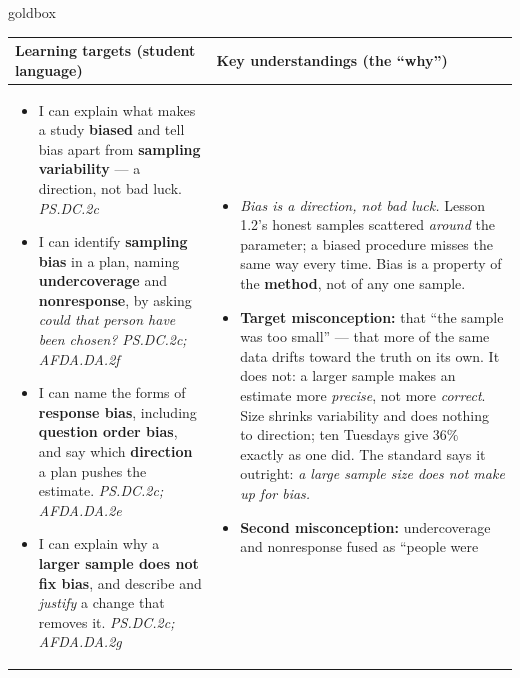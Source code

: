 \documentclass[10pt]{article}
\begin{document}
\renewcommand{\arraystretch}{1.4}
\boxguard
\begin{skillbox}{goldbox}
\begin{tabularx}{\linewidth}{@{}X|X@{}}
\textbf{Learning targets (student language)} & \textbf{Key understandings (the ``why'')} \\[2pt]
\hline
\vspace{-6pt}
\begin{itemize}[leftmargin=1.1em, nosep, after=\vspace{2pt}]
  \item I can explain what makes a study \textbf{biased} and tell bias apart from
        \textbf{sampling variability} --- a direction, not bad luck. \hfill \textit{PS.DC.2c}
  \item I can identify \textbf{sampling bias} in a plan, naming \textbf{undercoverage} and
        \textbf{nonresponse}, by asking \emph{could that person have been chosen?}
        \hfill \textit{PS.DC.2c; AFDA.DA.2f}
  \item I can name the forms of \textbf{response bias}, including \textbf{question order
        bias}, and say which \textbf{direction} a plan pushes the estimate.
        \hfill \textit{PS.DC.2c; AFDA.DA.2e}
  \item I can explain why a \textbf{larger sample does not fix bias}, and describe and
        \emph{justify} a change that removes it. \hfill \textit{PS.DC.2c; AFDA.DA.2g}
\end{itemize}
&
\vspace{-6pt}
\begin{itemize}[leftmargin=1.1em, nosep, after=\vspace{2pt}]
  \item \emph{Bias is a direction, not bad luck.} Lesson 1.2's honest samples scattered
        \emph{around} the parameter; a biased procedure misses the same way every time. Bias is
        a property of the \textbf{method}, not of any one sample.
  \item \textbf{Target misconception:} that ``the sample was too small'' --- that more of the
        same data drifts toward the truth on its own. It does not: a larger sample makes an
        estimate more \emph{precise}, not more \emph{correct}. Size shrinks variability and
        does nothing to direction; ten Tuesdays give $36\%$ exactly as one did. The standard
        says it outright: \emph{a large sample size does not make up for bias.}
  \item \textbf{Second misconception:} undercoverage and nonresponse fused as ``people were

\end{itemize}
\end{tabularx}
\end{skillbox}
\end{document}
